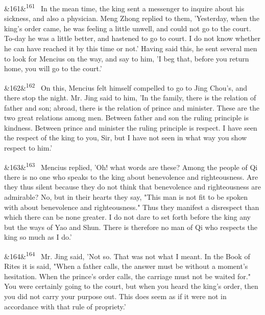\documentclass[12pt]{article}
\newcommand{\para}[1][]{\par\noindent\ifx&#1&\else\textsuperscript{\footnotesize #1}~\fi}
\begin{document}
\para[161] In the mean time, the king sent a messenger to inquire about his sickness, and also a physician. Meng Zhong replied to them, 'Yesterday, when the king's order came, he was feeling a little unwell, and could not go to the court. To-day he was a little better, and hastened to go to court. I do not know whether he can have reached it by this time or not.' Having said this, he sent several men to look for Mencius on the way, and say to him, 'I beg that, before you return home, you will go to the court.'

\para[162] On this, Mencius felt himself compelled to go to Jing Chou's, and there stop the night. Mr. Jing said to him, 'In the family, there is the relation of father and son; abroad, there is the relation of prince and minister. These are the two great relations among men. Between father and son the ruling principle is kindness. Between prince and minister the ruling principle is respect. I have seen the respect of the king to you, Sir, but I have not seen in what way you show respect to him.'

\para[163] Mencius replied, 'Oh! what words are these? Among the people of Qi there is no one who speaks to the king about benevolence and righteousness. Are they thus silent because they do not think that benevolence and righteousness are admirable? No, but in their hearts they say, "This man is not fit to be spoken with about benevolence and righteousness." Thus they manifest a disrespect than which there can be none greater. I do not dare to set forth before the king any but the ways of Yao and Shun. There is therefore no man of Qi who respects the king so much as I do.'

\para[164] Mr. Jing said, 'Not so. That was not what I meant. In the Book of Rites it is said, "When a father calls, the answer must be without a moment's hesitation. When the prince's order calls, the carriage must not be waited for." You were certainly going to the court, but when you heard the king's order, then you did not carry your purpose out. This does seem as if it were not in accordance with that rule of propriety.'
\end{document}
